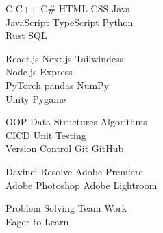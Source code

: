 \documentclass[]{main}
\begin{document}
\begin{minipage}[t]{0.33\textwidth}
C \textbullet{}   C++ \textbullet{} C\# \textbullet{} HTML \textbullet{} CSS \textbullet{} Java \\
JavaScript \textbullet{} TypeScript \textbullet{} Python \\
Rust \textbullet{} SQL
\sectionsep

React.js \textbullet{} Next.js \textbullet{} Tailwindcss \\
Node.js \textbullet{} Express \\
PyTorch \textbullet{} pandas \textbullet{} NumPy \\
Unity \textbullet{} Pygame
\sectionsep

OOP \textbullet{} Data Structures \textbullet{} Algorithms \\ CI\/CD \textbullet{} Unit Testing 
 \\ Version Control \textbullet{} Git \textbullet{} GitHub
 
\sectionsep
 
Davinci Resolve \textbullet{} Adobe Premiere
\\ Adobe Photoshop \textbullet{} Adobe Lightroom

\sectionsep

Problem Solving  \textbullet{} Team Work \\
Eager to Learn \\
\sectionsep

%
%

\end{minipage} 
\hfill
\end{document}
